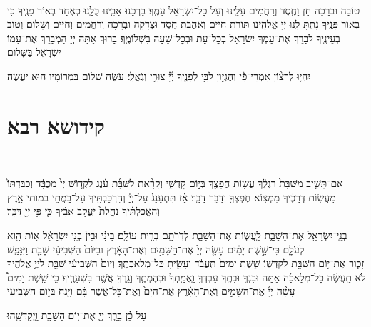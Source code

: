 \documentclass[twoside, openany, parskip=half, 11pt]{book}
\begin{document}
\shatz\\
טוֹבָה וּבְרָכָה חֵן וָחֶֽסֶד וְרַחֲמִים עָלֵֽינוּ וְעַל כׇּל־יִשְׂרָאֵל עַמֶּֽךָ׃ בָּרְכֵנוּ אָבִֽינוּ כֻּלָּֽנוּ כְּאֶחָד בְּאוֹר פָּנֶֽיךָ כִּי בְאוֹר פָּנֶֽיךָ נָתַֽתָּ לָֽנוּ יְיָ אֱלֹהֵֽינוּ תּוֹרַת חַיִּים וְאַהֲבַת חֶֽסֶד וּצְדָקָה וּבְרָכָה וְרַחֲמִים וְחַיִּים וְשָׁלוֹם׃ וְטוֹב בְּעֵינֶֽיךָ לְבָרֵךְ אֶת־עַמְּךָ יִשְׂרָאֵל בְּכׇל־עֵת וּבְכׇל־שָׁעָה בִּשְׁלוֹמֶֽךָ׃ בָּרוּךְ אַתָּה יְיָ הַמְבָרֵךְ אֶת־עַמּוֹ יִשְׂרָאֵל בַּשָּׁלוֹם׃

יִֽהְי֥וּ לְרָצ֨וֹן אִמְרֵי־פִ֡י וְהֶגְי֣וֹן לִבִּ֣י לְפָנֶ֑יךָ יְ֜יָ֗ צוּרִ֥י וְגֹֽאֲלִֽי׃ עֹשֶׂה שָׁלוֹם בִּמְרוֹמָיו הוּא יַעֲשֶׂה׃

\vfill



\nextpage

\siyyumshabbatYT

\mournerskaddish

\adonolam

\chapter[קידושא רבא ליו״ט]{ קידושא רבא }

\\\begin{footnotesize}
אִם־תָּשִׁ֤יב מִשַּׁבָּת֙ רַגְלֶ֔ךָ עֲשׂ֥וֹת חֲפָצֶ֖ךָ בְּי֣וֹם קׇדְשִׁ֑י וְקָרָ֨אתָ לַשַּׁבָּ֜ת עֹ֗נֶג לִקְד֤וֹשׁ יְיָ֙ מְכֻבָּ֔ד וְכִבַּדְתּוֹ֙ מֵעֲשׂ֣וֹת דְּרָכֶ֔יךָ מִמְּצ֥וֹא חֶפְצְךָ֖ וְדַבֵּ֥ר דָּבָֽר׃ אָ֗ז תִּתְעַנַּג֙ עַל־יְיָ֔ וְהִרְכַּבְתִּ֖יךָ עַל־בָּ֣מֳתֵי במותי אָ֑רֶץ וְהַאֲכַלְתִּ֗יךָ נַחֲלַת֙ יַֽעֲקֹ֣ב אָבִ֔יךָ כִּ֛י פִּ֥י יְיָ֖ דִּבֵּֽר׃

בְנֵֽי־יִשְׂרָאֵ֖ל אֶת־הַשַּׁבָּ֑ת לַֽעֲשׂ֧וֹת אֶת־הַשַּׁבָּ֛ת לְדֹֽרֹתָ֖ם בְּרִ֥ית עוֹלָֽם׃ בֵּינִ֗י וּבֵין֙ בְּנֵ֣י יִשְׂרָאֵ֔ל א֥וֹת הִ֖וא לְעֹלָ֑ם כִּי־שֵׁ֣שֶׁת יָמִ֗ים עָשָׂ֤ה יְיָ֙ אֶת־הַשָּׁמַ֣יִם וְאֶת־הָאָ֔רֶץ וּבַיּוֹם֙ הַשְּׁבִיעִ֔י שָׁבַ֖ת וַיִּנָּפַֽשׁ׃\\
זָכ֛וֹר אֶת־י֥וֹם הַשַּׁבָּ֖ת לְקַדְּשֽׁוֹ׃ שֵׁ֤שֶׁת יָמִים֙ תַּֽעֲבֹ֔ד וְעָשִׂ֖יתָ כׇּל־מְלַאכְתֶּֽךָ׃ וְיוֹם֙ הַשְּׁבִיעִ֔י שַׁבָּ֖ת לַיֽיֳ֣ אֱלֹהֶיךָ לֹא תַֽעֲשֶׂ֨ה כׇל־מְלָאכָ֜ה אַתָּ֣ה וּבִנְךָ֣ וּבִתֶֽךָ עַבְדְּךָ֤ וַֽאֲמָֽתְךָ֙ וּבְהֶמְתֶֽךָ וְגֵֽרְךָ֖ אֲשֶׁ֥ר בִּשְׁעָרֶֽיךָ׃ כִּ֣י שֵֽׁשֶׁת יָמִים֩ עָשָׂ֨ה יְיָ֜ אֶת־הַשָּׁמַ֣יִם וְאֶת־הָאָ֗רֶץ אֶת־הַיָּם֙ וְאֶת־כׇּל־אֲשֶׁר בָּ֔ם וַיָּ֖נַח בַּיּ֣וֹם הַשְּׁבִיעִי\\ \end{footnotesize} עַל כֵּ֗ן בֵּרַ֧ךְ יְיָ֛ אֶת־י֥וֹם הַשַּׁבָּ֖ת וַֽיְקַדְּשֵֽׁהוּ׃
\end{document}
